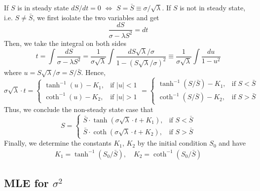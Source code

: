 \documentclass[mnsc]{informs3}
\begin{document}
\begin{APPENDICES}
If $S$ is in steady state $dS/dt = 0$ $\Leftrightarrow$ $S = \bar{S} \equiv \sigma/\sqrt{\lambda}$. 
If $S$ is not in steady state, i.e. $S\not=\bar{S}$, we first isolate the two variables and get 
\begin{equation*}
	\frac{dS}{\sigma-\lambda S^2} = dt
\end{equation*}
Then, we take the integral on both sides
\begin{equation*}
    t = \int \frac{dS}{\sigma-\lambda S^2} = \frac{1}{\sigma\sqrt{\lambda}} \int \frac{dS\sqrt{\lambda}/\sigma}{1 - (S\sqrt{\lambda}/\sigma)^2} \equiv \frac{1}{\sigma\sqrt{\lambda}}\int \frac{du}{1-u^2} 
\end{equation*}
where $u = S\sqrt{\lambda}/\sigma = S/\bar{S}$. Hence, 
\begin{equation*}
    \sigma\sqrt{\lambda}\cdot t = \begin{cases}
        \tanh^{-1}(u)-K_1, & \text{if } |u|<1\\
        \coth^{-1}(u)-K_2, & \text{if } |u|>1
    \end{cases} = \begin{cases}
        \tanh^{-1}(S/\bar{S})-K_1, & \text{if } S<\bar{S}\\
        \coth^{-1}(S/\bar{S})-K_2, & \text{if } S>\bar{S} 
\end{cases}
\end{equation*}
Thus, we conclude the non-steady state case that 
\begin{equation*}
	S = \begin{cases}
		\bar{S}\cdot\tanh(\sigma\sqrt{\lambda}\cdot t + K_1), & \text{if } S<\bar{S}\\
		\bar{S}\cdot\coth(\sigma\sqrt{\lambda}\cdot t + K_2), & \text{if } S>\bar{S} 
	\end{cases}
\end{equation*}
Finally, we determine the constants $K_1$, $K_2$ by the initial condition $S_0$ and have 
\begin{align*}
	K_1 = \tanh^{-1}(S_0/\bar{S}),\quad
	K_2 = \coth^{-1}(S_0/\bar{S})
\end{align*}


\subsection{MLE for $\sigma^2$}\label{appexidx-normal-MLE}


\end{APPENDICES}
\end{document}
